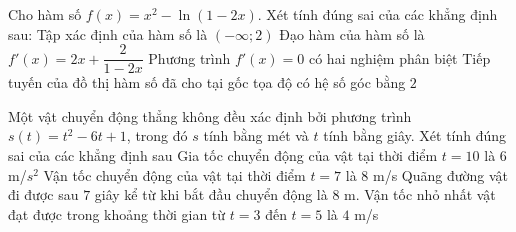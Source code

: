 \begin{ex}%
	Cho hàm số $f(x)=x^2-\ln(1-2x)$. Xét tính đúng sai của các khẳng định sau:
	\choiceTF
	{Tập xác định của hàm số là $(-\infty;2)$}
	{\True Đạo hàm của hàm số là $f'(x)=2x+\dfrac{2}{1-2x}$}
	{Phương trình $f'(x)=0$ có hai nghiệm phân biệt}
	{\True Tiếp tuyến của đồ thị hàm số đã cho tại gốc tọa độ có hệ số góc bằng $2$}
\end{ex}

\begin{ex}
	Một vật chuyển động thẳng không đều xác định bởi phương trình $s(t)=t^{2} - 6 t + 1$, trong đó ${s}$ tính bằng mét và ${t}$ tính bằng giây. Xét tính đúng sai của các khẳng định sau
	\choiceTF
	{ Gia tốc chuyển động của vật tại thời điểm $t=10$ là ${6}$ m/$s^2$ }
	{ \True Vận tốc chuyển động của vật tại thời điểm $t=7$ là ${8}$ m/s }
	{ \True Quãng đường vật đi được sau ${7}$ giây kể từ khi bắt đầu chuyển động là ${8}$  m. }
	{ Vận tốc nhỏ nhất vật đạt được trong khoảng thời gian từ $t=3$ đến $t=5$ là $4$ m/s }
	\end{ex}


